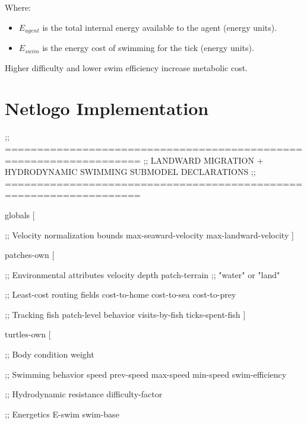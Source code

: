 \documentclass[
]{book}
\newenvironment{Shaded}{\begin{snugshade}}{\end{snugshade}}
\newcommand{\NormalTok}[1]{#1}
\providecommand{\tightlist}{%
  \setlength{\itemsep}{0pt}\setlength{\parskip}{0pt}}
\begin{document}
Where:

\begin{itemize}
\tightlist
\item
  \(E_{agent}\) is the total internal energy available to the agent
  (energy units).
\item
  \(E_{swim}\) is the energy cost of swimming for the tick (energy
  units).
\end{itemize}

Higher difficulty and lower swim efficiency increase metabolic cost.

\section{Netlogo Implementation}\label{netlogo-implementation-7}

\begin{Shaded}
\begin{Highlighting}[]
\NormalTok{;; ===================================================================}
\NormalTok{;;  LANDWARD MIGRATION + HYDRODYNAMIC SWIMMING SUBMODEL DECLARATIONS}
\NormalTok{;; ===================================================================}

\NormalTok{globals [}

\NormalTok{  ;; Velocity normalization bounds}
\NormalTok{  max{-}seaward{-}velocity}
\NormalTok{  max{-}landward{-}velocity}
\NormalTok{]}

\NormalTok{patches{-}own [}

\NormalTok{  ;; Environmental attributes}
\NormalTok{  velocity}
\NormalTok{  depth}
\NormalTok{  patch{-}terrain   ;; "water" or "land"}

\NormalTok{  ;; Least{-}cost routing fields}
\NormalTok{  cost{-}to{-}home}
\NormalTok{  cost{-}to{-}sea}
\NormalTok{  cost{-}to{-}prey}

\NormalTok{  ;; Tracking fish patch{-}level behavior}
\NormalTok{  visits{-}by{-}fish}
\NormalTok{  ticks{-}spent{-}fish}
\NormalTok{]}

\NormalTok{turtles{-}own [}

\NormalTok{  ;; Body condition}
\NormalTok{  weight}

\NormalTok{  ;; Swimming behavior}
\NormalTok{  speed}
\NormalTok{  prev{-}speed}
\NormalTok{  max{-}speed}
\NormalTok{  min{-}speed}
\NormalTok{  swim{-}efficiency}

\NormalTok{  ;; Hydrodynamic resistance}
\NormalTok{  difficulty{-}factor}

\NormalTok{  ;; Energetics}
\NormalTok{  E{-}swim}
\NormalTok{  swim{-}base}


\end{Highlighting}
\end{Shaded}
\end{document}

